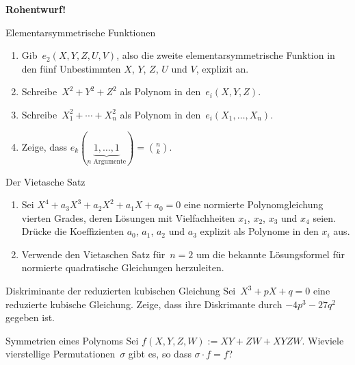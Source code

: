 \documentclass{algblatt}
\begin{document}
\vspace*{-1.5cm}

{\centering\textbf{Rohentwurf!}\par}

\begin{aufgabe}{Elementarsymmetrische Funktionen}
\begin{enumerate}
\item Gib~$e_2(X,Y,Z,U,V)$, also
die zweite elementarsymmetrische Funktion in den fünf Unbestimmten
$X$, $Y$, $Z$, $U$ und $V$, explizit an.
\item Schreibe~$X^2 + Y^2 + Z^2$ als Polynom in den~$e_i(X,Y,Z)$.
\item Schreibe~$X_1^2 + \cdots + X_n^2$ als Polynom in
den~$e_i(X_1,\ldots,X_n)$.
\item Zeige, dass $e_k(\underbrace{1, \dots, 1}_{\text{$n$ Argumente}}) = \binom{n}{k}$.
\end{enumerate}
\end{aufgabe}

\begin{aufgabe}{Der Vietasche Satz}
\begin{enumerate}
\item Sei $X^4 + a_3 X^3 + a_2 X^2 + a_1 X + a_0 = 0$ eine normierte Polynomgleichung
vierten Grades, deren Lösungen mit Vielfachheiten $x_1$, $x_2$, $x_3$
und $x_4$ seien. Drücke die Koeffizienten $a_0$, $a_1$, $a_2$ und
$a_3$ explizit als Polynome in den $x_i$ aus.
\item Verwende den Vietaschen Satz für~$n = 2$ um die bekannte Lösungsformel
für normierte quadratische Gleichungen herzuleiten.
\end{enumerate}
\end{aufgabe}

\begin{aufgabe}{Diskriminante der reduzierten kubischen Gleichung}
Sei~$X^3 + p X + q = 0$ eine reduzierte kubische Gleichung. Zeige, dass
ihre Diskrimante durch $-4 p^3 - 27 q^2$ gegeben ist.
\end{aufgabe}

\begin{aufgabe}{Symmetrien eines Polynoms}
Sei $f(X, Y, Z, W) := X Y + Z W + X Y Z W$.
Wieviele vierstellige Permutationen~$\sigma$ gibt es, so dass
$\sigma \cdot f = f$?
\end{aufgabe}
\end{document}
